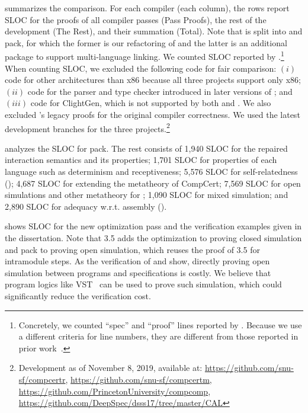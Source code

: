  summarizes the comparison.
For each compiler (\ie each column),
the rows report SLOC for the proofs of all compiler passes (Pass Proofs),
the rest of the development (The Rest),
and their summation (Total).
Note that \ccm{} is split into \ccr{} and \ccm{} pack, for which the former is our refactoring
of \cc{} and the latter is an additional package to support multi-language linking.
We counted SLOC reported by
.\footnote{Concretely, we counted ``spec'' and ``proof'' lines reported by .
  Because we use a different criteria for line numbers, they are different from those reported in
  prior work~\cite{stewart:ccc,gu:dscal,wang:saccx}.}  When counting SLOC, we excluded the following
code for fair comparison: $(i)$ code for other architectures than x86 because all three projects support
only x86; $(ii)$ code for the parser and type checker introduced in later versions of \cc{}; and $(iii)$ code for \textrm{ClightGen}, which is not supported by both \ccx{} and
\ccc{}.  We also excluded \ccc{}'s legacy proofs for the original compiler correctness.  We used the
latest development branches for the three projects.\footnote{Development as of November 8, 2019, available at: \url{https://github.com/snu-sf/compcertr}, \url{https://github.com/snu-sf/compcertm}, \url{https://github.com/PrincetonUniversity/compcomp}, \url{https://github.com/DeepSpec/dsss17/tree/master/CAL}}








 analyzes the  SLOC for \ccm{} pack.
The rest consists of
1,940 SLOC for the repaired interaction semantics and its properties;
1,701 SLOC for properties of each language such as determinism and receptiveness;
5,576 SLOC for self-relatedness ();
4,687 SLOC for extending the metatheory of CompCert;
7,569 SLOC for open simulations and other metatheory for \ccm{};
1,090 SLOC for mixed simulation; and
2,890 SLOC for adequacy w.r.t. assembly ().

 shows SLOC for the new optimization pass and the verification examples
given in the dissertation.  Note that  3.5 adds the optimization to \ccr{} proving closed simulation
and  pack to \ccm{} proving open simulation, which reuses the proof of  3.5 for intramodule steps.
As the verification of  and  show, directly proving
open simulation between programs and specifications is costly. 
We believe that program logics like VST~\cite{VST} can be used to prove such simulation,
which could significantly reduce the verification cost.

